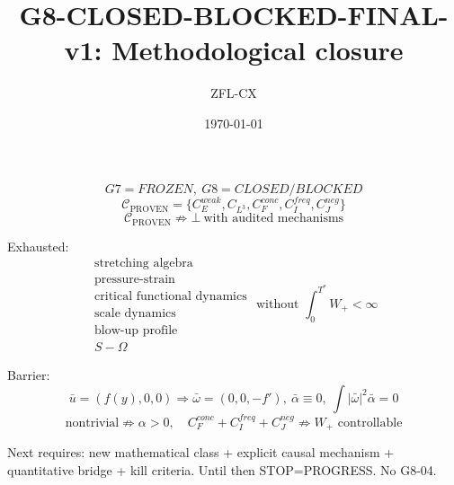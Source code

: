 \documentclass[11pt]{article}
\begin{document}
\title{G8-CLOSED-BLOCKED-FINAL-v1: Methodological closure}
\author{ZFL-CX}\date{\today}\maketitle

\[
\boxed{G7=FROZEN,\ G8=CLOSED/BLOCKED}
\]
\[
\boxed{\mathcal C_{\mathrm{PROVEN}}=\{C_E^{weak},C_{L^3},C_F^{conc},C_I^{freq},C_J^{neg}\}}
\]
\[
\boxed{\mathcal C_{\mathrm{PROVEN}}\not\Rightarrow\bot\ \text{with audited mechanisms}}
\]

Exhausted:
\[
\boxed{\begin{array}{c}
\text{stretching algebra}\\
\text{pressure-strain}\\
\text{critical functional dynamics}\\
\text{scale dynamics}\\
\text{blow-up profile}\\
S-\Omega
\end{array}}
\text{ without }\int_0^{T^*}W_+<\infty
\]

Barrier:
\[
\bar u=(f(y),0,0)\Rightarrow\bar\omega=(0,0,-f'),\ \bar\alpha\equiv0,\ \int|\bar\omega|^2\bar\alpha=0
\]
\[
\boxed{\text{nontrivial}\not\Rightarrow\alpha>0},\quad
\boxed{C_F^{conc}+C_I^{freq}+C_J^{neg}\not\Rightarrow W_+\text{ controllable}}
\]

Next requires: new mathematical class + explicit causal mechanism + quantitative bridge + kill criteria. Until then STOP=PROGRESS. No G8-04.
\end{document}
